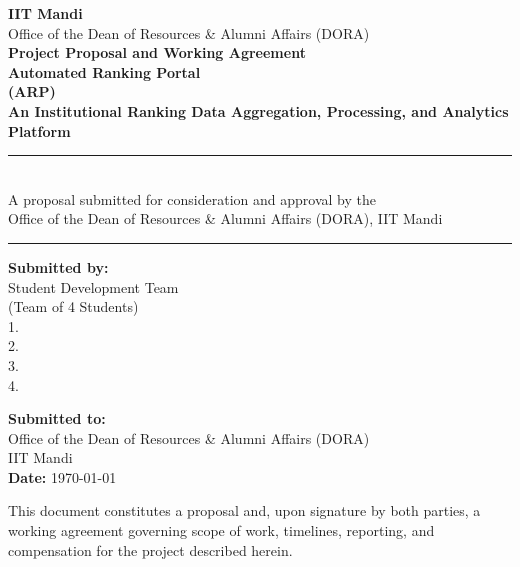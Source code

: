 \documentclass[11pt]{article}
\begin{document}
\begin{titlepage}
\thispagestyle{empty}
\begin{center}
\vspace*{1.0cm}
{\large\bfseries\color{primary} IIT Mandi}\\[4pt]
{\normalsize\color{darkgray} Office of the Dean of Resources \& Alumni Affairs (DORA)}\\[1.8cm]
{\Large\bfseries\color{secondary} Project Proposal and Working Agreement}\\[10pt]
{\huge\bfseries\color{primary} Automated Ranking Portal}\\[6pt]
{\Large\bfseries\color{primary} (ARP)}\\[10pt]
{\large\bfseries An Institutional Ranking Data Aggregation, Processing, and Analytics Platform}\\[1.2cm]
{\color{primary}\rule{0.85\textwidth}{1.5pt}}\\[10pt]
{\normalsize A proposal submitted for consideration and approval by the\\ Office of the Dean of Resources \& Alumni Affairs (DORA), IIT Mandi}\\[10pt]
{\color{primary}\rule{0.85\textwidth}{1.5pt}}
\vspace{1.2cm}

\begin{minipage}[t]{0.48\textwidth}
\textbf{Submitted by:}\\[4pt]
Student Development Team\\
(Team of 4 Students)\\[6pt]
1. \underline{\hspace{4.2cm}}\\[4pt]
2. \underline{\hspace{4.2cm}}\\[4pt]
3. \underline{\hspace{4.2cm}}\\[4pt]
4. \underline{\hspace{4.2cm}}
\end{minipage}
\hfill
\begin{minipage}[t]{0.48\textwidth}
\textbf{Submitted to:}\\[4pt]
Office of the Dean of Resources \& Alumni Affairs (DORA)\\
{}IIT Mandi\\[6pt]
\textbf{Date:} \today
\end{minipage}

\vfill
{\small This document constitutes a proposal and, upon signature by both parties, a working agreement governing scope of work, timelines, reporting, and compensation for the project described herein.}
\end{center}
\end{titlepage}
\end{document}
